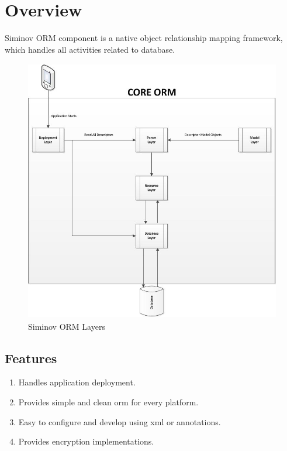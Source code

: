 \newpage
\chapter {\Large{Overview}}

Siminov ORM component is a native object relationship mapping framework, which handles all activities related to database.


\begin{figure}[!htbp]
	\centering
		\includegraphics[height=11.5cm]{Resources/siminov_architecture.jpg}
	\caption{Siminov ORM Layers}
\end{figure}


\section{Features}
\begin{enumerate}

	\small \item Handles application deployment.
	\small \item Provides simple and clean orm for every platform.
	\small \item Easy to configure and develop using xml or annotations.
	\small \item Provides encryption implementations.

\end{enumerate}
